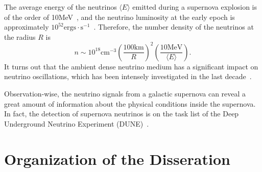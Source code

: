 The average energy of the neutrinos $\langle E \rangle$ emitted during a supernova explosion is of the order of 10MeV~\cite{Janka2017}, and the neutrino luminosity at the early epoch is approximately $10^{52}\mathrm{ergs\cdot s^{-1}}$~\cite{Pejcha2012a}.
Therefore, the number density of the neutrinos at the radius $R$ is
\begin{equation*}
   n \sim  10^{18} \mathrm{cm^{-3}} \left(\frac{100\mathrm{km}}{R}\right)^2 \left(\frac{10\mathrm{MeV}}{\langle E \rangle}\right).
\end{equation*}
It turns out that the ambient dense neutrino medium has a significant impact on neutrino oscillations, which has been intensely investigated in the last decade~\cite{Duan2010}.

Observation-wise, the neutrino signals from a galactic supernova can reveal a great amount of information about the physical conditions inside the supernova. In fact, the detection of supernova neutrinos is on the task list of the Deep Underground Neutrino Experiment (DUNE)~\cite{Kemp2017}.




\section{Organization of the Disseration}


